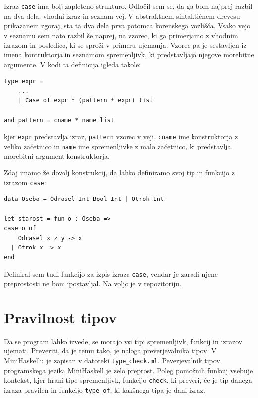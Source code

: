 \documentclass[a4paper,12pt,openright]{book}
\begin{document}
Izraz \lstinline{case} ima bolj zapleteno strukturo. Odločil sem se, da ga bom najprej razbil na dva dela: vhodni izraz in seznam vej. V abstraktnem sintaktičnem drevesu prikazanem zgoraj, 
sta ta dva dela prva potomca korenskega vozlišča. Vsako vejo v seznamu sem nato razbil še naprej, na vzorec, ki ga primerjamo z vhodnim izrazom in posledico, ki se sproži v primeru ujemanja. 
Vzorec pa je sestavljen iz imena kontruktorja in seznamom spremenljivk, ki predstavljajo njegove morebitne argumente. V kodi ta definicija igleda takole:
\begin{lstlisting}
type expr =
    ...
    | Case of expr * (pattern * expr) list

and pattern = cname * name list
\end{lstlisting}
kjer \lstinline{expr} predstavlja izraz, \lstinline{pattern} vzorec v veji, \lstinline{cname} ime konstruktorja z veliko začetnico in \lstinline{name} ime spremenljivke z malo začetnico, ki predstavlja morebitni 
argument konstruktorja. 

Zdaj imamo že dovolj konstrukcij, da lahko definiramo svoj tip in funkcijo z izrazom \lstinline{case}: 
\begin{lstlisting}
data Oseba = Odrasel Int Bool Int | Otrok Int

let starost = fun o : Oseba => 
case o of 
    Odrasel x z y -> x 
  | Otrok x -> x
end
\end{lstlisting}

Definiral sem tudi funkcijo za izpis izraza \lstinline{case}, vendar je zaradi njene preprostosti ne bom ipostavljal. Na voljo je v repozitoriju.

\section{Pravilnost tipov}
 Da se program lahko izvede, se morajo vsi tipi spremenljivk, funkcij in izrazov ujemati. Preveriti, da je temu tako, je naloga preverjevalnika tipov. V MiniHaskellu je zapisan v datoteki 
 \lstinline{type_check.ml}. Peverjevalnik tipov programskega jezika MiniHaskell je zelo preprost. Poleg pomožnih funkcij vsebuje kontekst, kjer hrani tipe spremenljivk, funkcijo \lstinline{check}, 
 ki preveri, če je tip danega izraza pravilen in funkcijo \lstinline{type_of}, ki kakšnega tipa je dani izraz.
 
\end{document}
